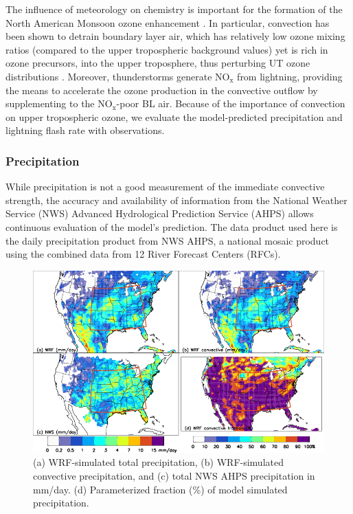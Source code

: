 The influence of meteorology on chemistry is important for the formation of
the North American Monsoon ozone enhancement \citep{Li:2005ss,Cooper:2007cr,Barth:2012qf}.
In particular, convection has been shown to detrain boundary layer air, which has relatively low
ozone mixing ratios (compared to the upper tropospheric background values) yet is rich in ozone
precursors, into the upper troposphere, thus perturbing UT ozone distributions
\citep{Dickerson:1987hc,Kar:2004jl,Li:2005ss,Weinstock:2007yj}. Moreover, thunderstorms generate
NO$_\mathrm{x}$ from lightning, providing the means to accelerate the ozone production
in the convective outflow by supplementing to the NO$_\mathrm{x}$-poor BL air.
Because of the importance of convection on upper tropospheric ozone, we evaluate the
model-predicted precipitation and lightning flash rate with observations.

\subsubsection{Precipitation}

While precipitation is not a good measurement of the immediate convective strength, the
accuracy and availability of information from the National Weather Service (NWS) Advanced
Hydrological Prediction Service (AHPS) allows continuous evaluation of the model's
prediction. The data product used here is the daily precipitation product from NWS AHPS,
a national mosaic product using the combined data from 12 River Forecast Centers (RFCs).

 \begin{figure}
 \noindent\includegraphics[width=40pc]{Figures/precip_sd.png}
 \caption[Model simulated precipitation vs. NWS observation]{(a) WRF-simulated total precipitation, (b) WRF-simulated convective precipitation, and
(c) total NWS AHPS precipitation in mm/day. (d) Parameterized fraction (\%) of model simulated
precipitation.}
 \label{fig:precip_sd}
 \end{figure}

